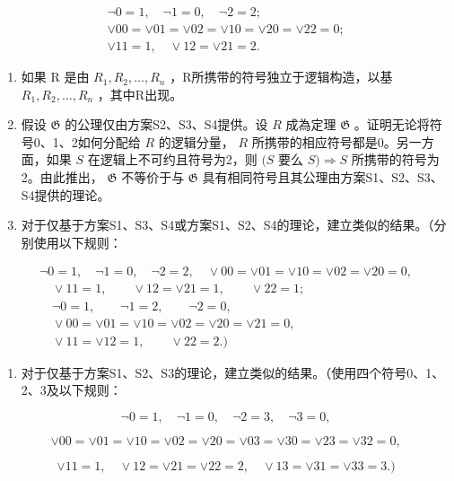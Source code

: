 \[
\begin{array}{c} \neg 0 = 1, \quad \neg 1 = 0, \quad \neg 2 = 2; \\ \lor 0 0 = \lor 0 1 = \lor 0 2 = \lor 1 0 = \lor 2 0 = \lor 2 2 = 0; \\ \lor 1 1 = 1, \quad \lor 1 2 = \lor 2 1 = 2. \end{array}
\]

\begin{enumerate}
\def\labelenumi{(\alph{enumi})}
\item
  如果 R 是由 \(R_{1}, R_{2}, \ldots, R_{n}\) ，R所携带的符号独立于逻辑构造，以基 \(R_{1}, R_{2}, \ldots, R_{n}\) ，其中R出现。
\item
  假设 \(\mathfrak{G}\) 的公理仅由方案S2、S3、S4提供。设 \(R\) 成為定理 \(\mathfrak{G}\) 。证明无论将符号0、1、2如何分配给 \(R\) 的逻辑分量， \(R\) 所携带的相应符号都是0。另一方面，如果 \(S\) 在逻辑上不可约且符号为2，则 \((S\) 要么 \(S) \Longrightarrow S\) 所携带的符号为2。由此推出， \(\mathfrak{G}\) 不等价于与 \(\mathfrak{G}\) 具有相同符号且其公理由方案S1、S2、S3、S4提供的理论。
\item
  对于仅基于方案S1、S3、S4或方案S1、S2、S4的理论，建立类似的结果。（分别使用以下规则：
\end{enumerate}

\[
\begin{array}{c} \neg 0 = 1, \quad \neg 1 = 0, \quad \neg 2 = 2, \quad \lor 0 0 = \lor 0 1 = \lor 1 0 = \lor 0 2 = \lor 2 0 = 0, \\ \quad \lor 1 1 = 1, \qquad \lor 1 2 = \lor 2 1 = 1, \qquad \lor 2 2 = 1; \\ \quad \neg 0 = 1, \qquad \neg 1 = 2, \qquad \neg 2 = 0, \\ \quad \lor 0 0 = \lor 0 1 = \lor 1 0 = \lor 0 2 = \lor 2 0 = \lor 2 1 = 0, \\ \quad \lor 1 1 = \lor 1 2 = 1, \qquad \lor 2 2 = 2.) \end{array}
\]

\begin{enumerate}
\def\labelenumi{(\alph{enumi})}
\setcounter{enumi}{3}
\tightlist
\item
  对于仅基于方案S1、S2、S3的理论，建立类似的结果。（使用四个符号0、1、2、3及以下规则：
\end{enumerate}

\[
\lnot 0 = 1, \quad \lnot 1 = 0, \quad \lnot 2 = 3, \quad \lnot 3 = 0,
\]

\[
\vee 0 0 = \vee 0 1 = \vee 1 0 = \vee 0 2 = \vee 2 0 = \vee 0 3 = \vee 3 0 = \vee 2 3 = \vee 3 2 = 0,
\]

\[
\vee 1 1 = 1, \quad \vee 1 2 = \vee 2 1 = \vee 2 2 = 2, \quad \vee 1 3 = \vee 3 1 = \vee 3 3 = 3.)
\]

